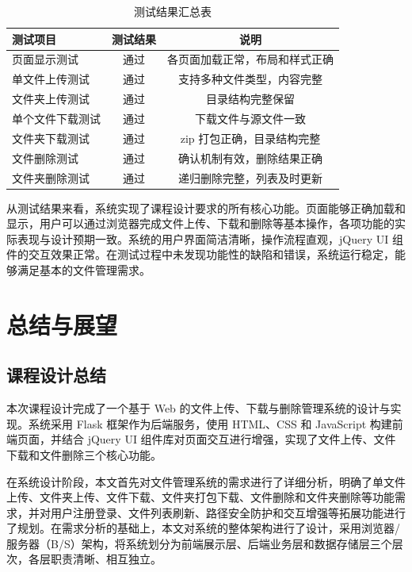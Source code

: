 \documentclass[UTF8,zihao=-4]{ctexrep}
\begin{document}
\begin{table}[H]
    \centering
    \caption{测试结果汇总表}\label{tab:test_summary}
    \begin{tabular}{|l|c|c|}
        \hline
        \textbf{测试项目} & \textbf{测试结果} & \textbf{说明} \\
        \hline
        页面显示测试 & 通过 & 各页面加载正常，布局和样式正确 \\
        \hline
        单文件上传测试 & 通过 & 支持多种文件类型，内容完整 \\
        \hline
        文件夹上传测试 & 通过 & 目录结构完整保留 \\
        \hline
        单个文件下载测试 & 通过 & 下载文件与源文件一致 \\
        \hline
        文件夹下载测试 & 通过 & zip 打包正确，目录结构完整 \\
        \hline
        文件删除测试 & 通过 & 确认机制有效，删除结果正确 \\
        \hline
        文件夹删除测试 & 通过 & 递归删除完整，列表及时更新 \\
        \hline
    \end{tabular}
\end{table}

从测试结果来看，系统实现了课程设计要求的所有核心功能。页面能够正确加载和显示，用户可以通过浏览器完成文件上传、下载和删除等基本操作，各项功能的实际表现与设计预期一致。系统的用户界面简洁清晰，操作流程直观，jQuery UI 组件的交互效果正常。在测试过程中未发现功能性的缺陷和错误，系统运行稳定，能够满足基本的文件管理需求。


\chapter{总结与展望}

\section{课程设计总结}

本次课程设计完成了一个基于 Web 的文件上传、下载与删除管理系统的设计与实现。系统采用 Flask 框架作为后端服务，使用 HTML、CSS 和 JavaScript 构建前端页面，并结合 jQuery UI 组件库对页面交互进行增强，实现了文件上传、文件下载和文件删除三个核心功能。

在系统设计阶段，本文首先对文件管理系统的需求进行了详细分析，明确了单文件上传、文件夹上传、文件下载、文件夹打包下载、文件删除和文件夹删除等功能需求，并对用户注册登录、文件列表刷新、路径安全防护和交互增强等拓展功能进行了规划。在需求分析的基础上，本文对系统的整体架构进行了设计，采用浏览器/服务器（B/S）架构，将系统划分为前端展示层、后端业务层和数据存储层三个层次，各层职责清晰、相互独立。
\end{document}
